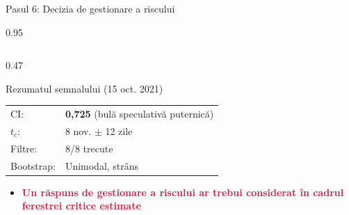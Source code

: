 \documentclass[9pt, aspectratio=169, t]{beamer}
\begin{document}
\begin{frame}{Pasul 6: Decizia de gestionare a riscului}
    \begin{cminipage}{0.95\textwidth}
    {\footnotesize
    \begin{columns}[T]
        \begin{column}{0.47\textwidth}
            \begin{alertblock}{Rezumatul semnalului (15 oct. 2021)}
                \begin{tabular}{ll}
                    CI: & \textbf{0,725} (bulă speculativă puternică) \\
                    $t_c$: & 8 nov. $\pm$ 12 zile \\
                    Filtre: & 8/8 trecute \\
                    Bootstrap: & Unimodal, strâns \\
                \end{tabular}

                \begin{itemize}\setlength{\itemsep}{0pt}
                    \item \textcolor{Crimson}{\textbf{Un răspuns de gestionare a riscului ar trebui considerat în cadrul ferestrei critice estimate}}
                \end{itemize}
            \end{alertblock}


\end{column}
\end{columns}}
\end{cminipage}
\end{frame}
\end{document}
